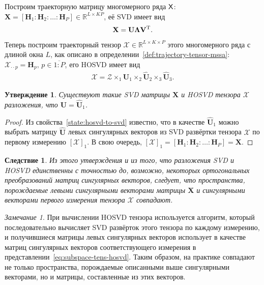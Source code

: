 \documentclass[specialist,
    substylefile = spbu_report.rtx,
    subf,href,colorlinks=true, 12pt]{disser}
\theoremstyle{plain}
\newtheorem{statement}{Утверждение}[section]
\newtheorem{corollary}{Следствие}[statement]
\theoremstyle{definition}
\theoremstyle{remark}
\newtheorem*{remark}{Замечание}
\begin{document}
    Построим траекторную матрицу многомерного ряда $\mathsf{X}$:
    $\mathbf{X} = [\mathbf{H}_1: \mathbf{H}_2: \ldots: \mathbf{H}_P] \in \mathbb{R}^{L\times KP}$,
    её SVD имеет вид
    \begin{gather*}
        \mathbf{X} =\mathbf{U} \mathbf{\Lambda} \mathbf{V}^{\mathrm{T}}.
    \end{gather*}
    Теперь построим траекторный тензор $\mathcal{X}\in \mathbb{R}^{L\times K \times P}$ этого многомерного ряда
    с длиной окна $L$, как описано в определении~\ref{def:trajectory-tensor-mssa}:
    $\mathcal{X}_{\cdot \cdot p} = \mathbf{H}_p,\, p\in \overline{1:P}$,
    его HOSVD имеет вид
    \begin{gather}
        \mathcal{X}=\mathcal{Z} \times_1 \hat{\mathbf{U}}_1 \times_2 \hat{\mathbf{U}}_2 \times_3 \hat{\mathbf{U}}_3.
        \label{eq:subspace-tens-hosvd}
    \end{gather}

    \begin{statement}
        Существуют такие \emph{SVD} матрицы $\mathbf{X}$ и \emph{HOSVD} тензора $\mathcal{X}$ разложения, что
        $\mathbf{U} = \hat{\mathbf{U}}_1$.\label{state:tens-mssa-rank}
    \end{statement}

    \begin{proof}
        Из свойства~\ref{state:hosvd-to-svd} известно, что в качестве $\hat{\mathbf{U}}_1$ можно выбрать матрицу
        $\hat{\mathbf{U}}$ левых сингулярных векторов из SVD развёртки тензора $\mathcal{X}$ по первому измерению $[\mathcal{X}]_{1}$.
        В свою очередь, $[\mathcal{X}]_{1} = [\mathbf{H}_1: \mathbf{H}_2: \ldots: \mathbf{H}_P] = \mathbf{X}$.
    \end{proof}

    \begin{corollary}
        Из этого утверждения и из того, что разложения SVD и HOSVD единственны с точностью
        до, возможно, некоторых ортогональных преобразований матриц сингулярных векторов,
        следует, что пространства, порождаемые левыми сингулярными векторами матрицы $\mathbf{X}$
        и сингулярными векторами первого измерения тензора $\mathcal{X}$ совпадают.
    \end{corollary}

    \begin{remark}
        При вычислении HOSVD тензора используется алгоритм, который последовательно вычисляет SVD развёрток этого тензора
        по каждому измерению, и получившиеся матрицы левых сингулярных векторов использует в качестве матриц сингулярных
        векторов соответствующего измерения в представлении~\eqref{eq:subspace-tens-hosvd}.
        Таким образом, на практике совпадают не только пространства, порождаемые описанными выше сингулярными векторами,
        но и матрицы, составленные из этих векторов.
    \end{remark}
\end{document}
